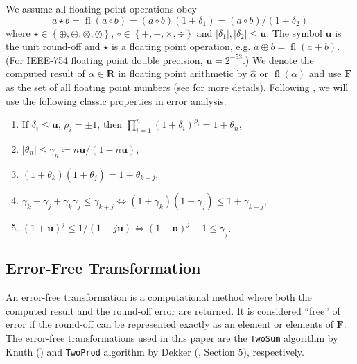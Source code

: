 \documentclass[3p, authoryear, square]{elsarticle}
\theoremstyle{definition}
\newcommand{\fl}[1]{\operatorname{fl}\left(#1\right)}
\newcommand{\mach}{\mathbf{u}}
\begin{document}
We assume all floating point operations obey
\begin{equation}
  a \star b = \fl{a \circ b} = (a \circ b)(1 + \delta_1) =
  (a \circ b) / (1 + \delta_2)
\end{equation}
where \(\star \in \left\{\oplus, \ominus, \otimes, \oslash\right\}\), \(\circ
\in \left\{+, -, \times, \div\right\}\) and \(\left|\delta_1\right|,
\left|\delta_2\right| \leq \mach\). The symbol \(\mach\) is the unit round-off
and \(\star\) is a floating point operation, e.g.
\(a \oplus b = \fl{a + b}\). (For IEEE-754 floating point double precision,
\(\mach = 2^{-53}\).) We denote the computed result of
\(\alpha \in \mathbf{R}\) in floating point arithmetic by
\(\widehat{\alpha}\) or \(\fl{\alpha}\) and use \(\mathbf{F}\) as the set of
all floating point numbers (see \cite{Higham2002} for more details).
Following \cite{Higham2002}, we will use the following classic properties in
error analysis.

\begin{enumerate}
  \item If \(\delta_i \leq \mach\), \(\rho_i = \pm 1\), then
      \(\prod_{i = 1}^n (1 + \delta_i)^{\rho_i} = 1 + \theta_n\),
  \item \(\left|\theta_n\right| \leq \gamma_n \coloneqq
      n \mach / (1 - n \mach)\),
  \item \((1 + \theta_k)(1 + \theta_j) = 1 + \theta_{k + j}\),
  \item \(\gamma_k + \gamma_j + \gamma_k \gamma_j \leq \gamma_{k + j}
    \Longleftrightarrow (1 + \gamma_k)(1 + \gamma_j) \leq 1 + \gamma_{k + j}\),
  \item \((1 + \mach)^j \leq 1 / (1 - j \mach) \Longleftrightarrow
  (1 + \mach)^j - 1 \leq \gamma_j\).
\end{enumerate}

\subsection{Error-Free Transformation}

An error-free transformation is a computational method where both
the computed result and the round-off error are returned. It
is considered ``free'' of error if the round-off can be represented
exactly as an element or elements of \(\mathbf{F}\).
The error-free transformations used in this paper are
the \texttt{TwoSum} algorithm by Knuth (\cite{Knuth1969}) and
\texttt{TwoProd} algorithm by Dekker (\cite{Dekker1971}, Section 5),
respectively.
\end{document}
